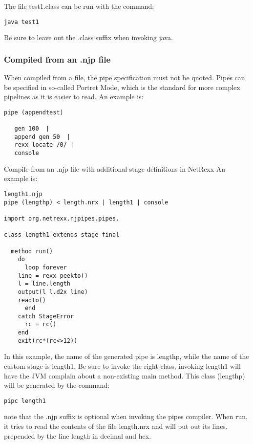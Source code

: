 The file test1.class can be run with the command:
\begin{verbatim}
java test1
\end{verbatim}
Be sure to leave out the .class suffix when invoking java.
\subsubsection{Compiled from an .njp file}
When compiled from a file, the pipe specification must not be quoted. Pipes can be specified in so-called Portret Mode, which is the standard for more complex pipelines as it is easier to read.
An example is:
\begin{verbatim}
pipe (appendtest)
 
   gen 100  |
   append gen 50  |
   rexx locate /0/ |
   console
\end{verbatim}
Compile from an .njp file with additional stage definitions in NetRexx
An example is:
\begin{verbatim}
length1.njp
pipe (lengthp) < length.nrx | length1 | console
 
import org.netrexx.njpipes.pipes.
 
class length1 extends stage final
 
  method run()
    do
      loop forever
    line = rexx peekto()
    l = line.length
    output(l l.d2x line)
    readto()
      end
    catch StageError
      rc = rc()
    end
    exit(rc*(rc<>12))
\end{verbatim}
In this example, the name of the generated pipe is lengthp, while the name of the custom stage is length1. Be sure to invoke the right class, invoking length1 will have the JVM complain about a non-existing main method.
This class (lengthp) will be generated by the command:
\begin{verbatim}
pipc length1
\end{verbatim}
note that the .njp suffix is optional when invoking the pipes compiler. When run, it tries to read the contents of the file length.nrx and will put out its lines, prepended by the line length in decimal and hex.





%  

